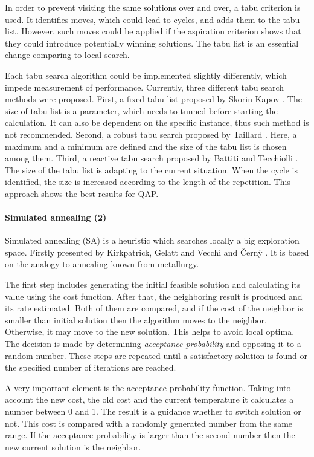 In order to prevent visiting the same solutions over and over, a tabu criterion is used.
It identifies moves, which could lead to cycles, and adds them to the tabu list.
However, such moves could be applied if the aspiration criterion shows that they could introduce potentially winning solutions.
The tabu list is an essential change comparing to local search.

Each tabu search algorithm could be implemented slightly differently, which impede measurement of performance.
Currently, three different tabu search methods were proposed.
First, a fixed tabu list proposed by Skorin-Kapov \cite{skorin1990tabu}.
The size of tabu list is a parameter, which needs to tunned before starting the calculation.
It can also be dependent on the specific instance, thus such method is not recommended.
Second, a robust tabu search proposed by Taillard \cite{taillard1991robust}.
Here, a maximum and a minimum are defined and the size of the tabu list is chosen among them.
Third, a reactive tabu search proposed by Battiti and Tecchiolli \cite{battiti1994reactive}.
The size of the tabu list is adapting to the current situation.
When the cycle is identified, the size is increased according to the length of the repetition.
This approach shows the best results for QAP.

\paragraph{Simulated annealing (2)}

Simulated annealing (SA) is a heuristic which searches locally a big exploration space.
Firstly presented by Kirkpatrick, Gelatt and Vecchi \cite{kirkpatrick1983optimization} and {\v{C}}ern{\`y} \cite{vcerny1985thermodynamical}.
It is based on the analogy to annealing known from metallurgy.

The first step includes generating the initial feasible solution and calculating its value using the cost function.
After that, the neighboring result is produced and its rate estimated.
Both of them are compared, and if the cost of the neighbor is smaller than initial solution then the algorithm moves to the neighbor.
Otherwise, it may move to the new solution.
This helps to avoid local optima.
The decision is made by determining \textit{acceptance probability} and opposing it to a random number.
These steps are repeated until a satisfactory solution is found or the specified number of iterations are reached.

A very important element is the acceptance probability function.
Taking into account the new cost, the old cost and the current temperature it calculates a number between 0 and 1.
The result is a guidance whether to switch solution or not.
This cost is compared with a randomly generated number from the same range.
If the acceptance probability is larger than the second number then the new current solution is the neighbor.

